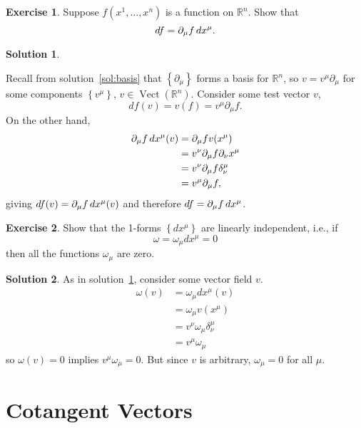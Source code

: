 \documentclass[11pt, a4paper]{report}
\theoremstyle{definition}
\newtheorem{exercise}{Exercise}[part]
\newtheorem{solution}{Solution}[part]
\newenvironment{ex}{\begin{exercise}}{\end{exercise}\pagebreak[1]}
\newenvironment{sol}{\begin{solution}}{\end{solution}\pagebreak[3]}
\newcommand*{\op}[1]{\ensuremath\mathop{}\mathopen{}#1}
\renewcommand*{\d}{\op{d}}
\DeclareMathOperator{\Vect}{Vect}
\begin{document}
\begin{ex}

Suppose $f(x^1, \ldots, x^n)$ is a function on $\mathbb{R}^n$. Show that
\[
    df = \partial_\mu f \d x^\mu.
\]

\end{ex}

\begin{sol}\label{sol:gradient}

Recall from solution~\ref{sol:basis} that $\left\{\partial_\mu\right\}$ forms a basis for $\mathbb{R}^n$, so $v = v^\mu \partial_\mu$ for some components $\left\{v^\mu\right\}$, $v \in \Vect(\mathbb{R}^n)$. Consider some test vector $v$,
\[
    df(v) = v(f) = v^\mu \partial_\mu f.
\]
On the other hand,
\begin{align*}
    \partial_\mu f \d x^\mu (v) &= \partial_\mu f v(x^\mu) \\
        &= v^\nu \partial_\mu f \partial_\nu x^\mu \\
        &= v^\nu \partial_\mu f \delta_\nu^\mu \\
        &= v^\mu \partial_\mu f,
\end{align*}
giving $df(v) = \partial_\mu f \d x^\mu(v)$ and therefore $df = \partial_\mu f\d x^\mu$.

\end{sol}

\begin{ex}

Show that the 1-forms $\left\{dx^\mu\right\}$ are linearly independent, i.e., if
\[
    \omega = \omega_\mu dx^\mu = 0
\]
then all the functions $\omega_\mu$ are zero.

\end{ex}

\begin{sol}

As in solution~\ref{sol:gradient}, consider some vector field $v$.
\begin{align*}
    \omega (v) &= \omega_\mu dx^\mu (v) \\
               &= \omega_\mu v(x^\mu) \\
               &= v^\nu \omega_\mu \delta_\nu^\mu \\
               &= v^\mu \omega_\mu
\end{align*}
so $\omega(v) = 0$ implies $v^\mu \omega_\mu = 0$. But since $v$ is arbitrary, $\omega_\mu = 0$ for all $\mu$.

\end{sol}

\section{Cotangent Vectors}\label{sec:cotangentvectors}
\end{document}
